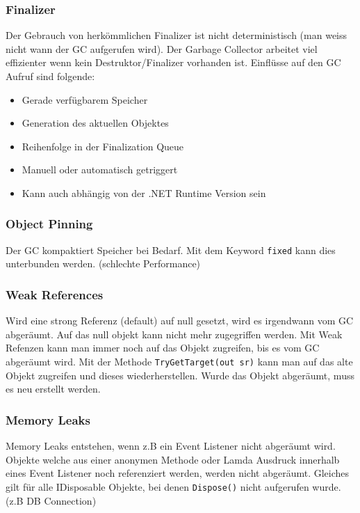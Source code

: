 \documentclass[
a4paper,
oneside,
10pt,
fleqn,
headsepline,
toc=listofnumbered, 
bibliography=totocnumbered]{scrartcl}
\begin{document}
\subsubsection{Finalizer} Der Gebrauch von herkömmlichen Finalizer ist nicht deterministisch (man weiss nicht wann der GC aufgerufen wird). Der Garbage Collector arbeitet viel effizienter wenn kein Destruktor/Finalizer vorhanden ist. Einflüsse auf den GC Aufruf sind folgende:
\begin{itemize}
	\item Gerade verfügbarem Speicher
	\item Generation des aktuellen Objektes
	\item Reihenfolge in der Finalization Queue
	\item Manuell oder automatisch getriggert
	\item Kann auch abhängig von der .NET Runtime Version sein
\end{itemize}

\subsubsection{Object Pinning} Der GC kompaktiert Speicher bei Bedarf. Mit dem Keyword \lstinline|fixed| kann dies unterbunden werden. (schlechte Performance)

\subsubsection{Weak References} Wird eine strong Referenz (default) auf null gesetzt, wird es irgendwann vom GC abgeräumt. Auf das null objekt kann nicht mehr zugegriffen werden. Mit Weak Refenzen kann man immer noch auf das Objekt zugreifen, bis es vom GC abgeräumt wird. Mit der Methode \lstinline|TryGetTarget(out sr)| kann man auf das alte Objekt zugreifen und dieses wiederherstellen. Wurde das Objekt abgeräumt, muss es neu erstellt werden.

\subsubsection{Memory Leaks} Memory Leaks entstehen, wenn z.B ein Event Listener nicht abgeräumt wird. Objekte welche aus einer anonymen Methode oder Lamda Ausdruck innerhalb eines Event Listener noch referenziert werden, werden nicht abgeräumt. Gleiches gilt für alle IDisposable Objekte, bei denen \lstinline|Dispose()| nicht aufgerufen wurde. (z.B DB Connection)
\end{document}
